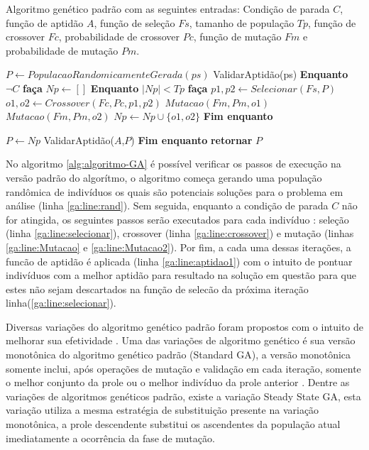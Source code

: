 \documentclass[
	12pt,				%
	oneside,			%
	a4paper,			%
	english,			%
	brazil				%
	]{abntex2ppgsi}
\begin{document}
\begin{algorithm}[htbp]
\caption{Algoritmo genético padrão com as seguintes entradas: Condição de parada $C$, função de aptidão $A$, função de seleção $Fs$, tamanho de população $Tp$, função de crossover $Fc$, probabilidade de crossover $Pc$, função de mutação $Fm$ e probabilidade de mutação $Pm$.}
\label{alg:algoritmo-genetico}


\begin{algorithmic}[1]

\State$ P \leftarrow  PopulacaoRandomicamenteGerada(ps)$ \label{ga:line:rand}
\State ValidarAptidão(ps)
\State \textbf{Enquanto} $\neg C$ \textbf{faça}
\State \quad $ Np \leftarrow  []$
\State \quad \textbf{Enquanto} $ |Np| < Tp $ \textbf{faça}
\State \quad \quad  $ p1,p2 \leftarrow Selecionar(Fs, P) $ \label{ga:line:selecionar}
\State \quad \quad  $ o1,o2 \leftarrow Crossover(Fc, Pc, p1,p2) $ \label{ga:line:crossover}
\State \quad \quad  $ Mutacao(Fm, Pm, o1) $ \label{ga:line:Mutacao}
\State \quad \quad  $ Mutacao(Fm, Pm, o2) $ \label{ga:line:Mutacao2}
\State \quad \quad  $ Np \leftarrow  Np \cup \{o1,o2\}$
\State \quad \textbf{Fim enquanto}

\State  $ P\leftarrow  Np$
\State ValidarAptidão($A$,$P$) \label{ga:line:aptidao1}
\State \textbf{Fim enquanto}
\State \textbf{retornar} $P$

\end{algorithmic}
\label{alg:algoritmo-GA}
\end{algorithm}

No algoritmo \ref{alg:algoritmo-GA} é possível verificar os passos de execução na versão padrão do algorítmo, o algoritmo começa gerando uma população randômica de indivíduos os quais são potenciais soluções para o problema em análise (linha \ref{ga:line:rand}). Sem seguida, enquanto a condição de parada $C$ não for atingida, os seguintes passos serão executados para cada indivíduo : seleção (linha \ref{ga:line:selecionar}), crossover (linha \ref{ga:line:crossover}) e mutação (linhas \ref{ga:line:Mutacao} e \ref{ga:line:Mutacao2}). Por fim, a cada uma dessas iterações, a funcão de aptidão é aplicada (linha \ref{ga:line:aptidao1}) com o intuito de pontuar indivíduos com a melhor aptidão para resultado na solução em questão para que estes não sejam descartados na função de selecão da próxima iteração linha(\ref{ga:line:selecionar}). 

Diversas variações do algoritmo genético padrão foram propostos com o intuito de melhorar sua efetividade \cite{Campos2017}. Uma das variações de algoritmo genético é sua versão monotônica do algoritmo genético padrão (Standard GA), a versão monotônica somente inclui, após operações de mutação e validação em cada iteração, somente o melhor conjunto da prole ou o melhor indivíduo da prole anterior \cite{Campos2017}.  Dentre as variações de algoritmos genéticos padrão, existe a variação Steady State GA, esta variação utiliza a mesma estratégia de substituição presente na variação monotônica, a prole descendente substitui os ascendentes da população atual imediatamente a ocorrência da fase de mutação.  \cite{Campos2017}
\end{document}
